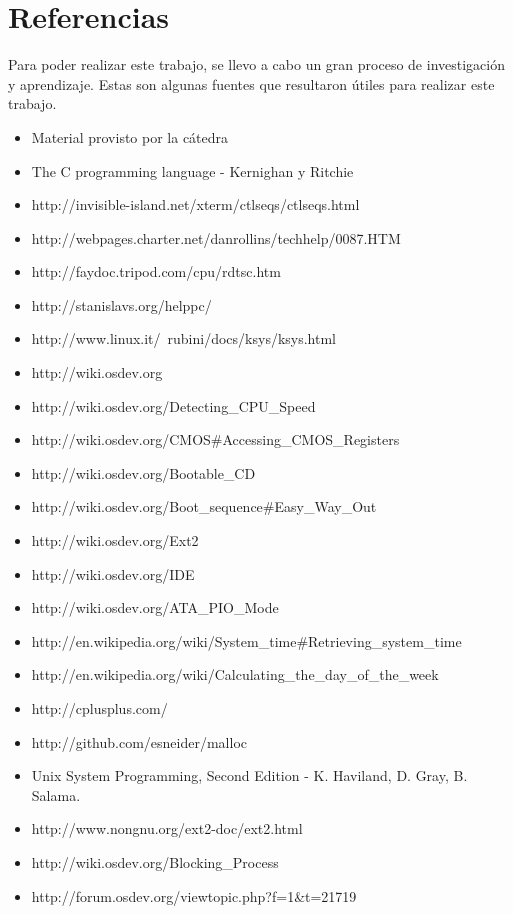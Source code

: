 \documentclass[a4paper,10pt]{article}
\begin{document}
\newpage     
\section{Referencias}

Para poder realizar este trabajo, se llevo a cabo un gran proceso de investigación y aprendizaje. Estas son algunas fuentes que resultaron útiles para realizar 
este trabajo.\\

\begin{itemize}
  \item Material provisto por la cátedra
  \item The C programming language - Kernighan y Ritchie
  \item http://invisible-island.net/xterm/ctlseqs/ctlseqs.html
  \item http://webpages.charter.net/danrollins/techhelp/0087.HTM
  \item http://faydoc.tripod.com/cpu/rdtsc.htm
  \item http://stanislavs.org/helppc/
  \item http://www.linux.it/~rubini/docs/ksys/ksys.html
  \item http://wiki.osdev.org
  \item http://wiki.osdev.org/Detecting\_CPU\_Speed
  \item	http://wiki.osdev.org/CMOS\#Accessing\_CMOS\_Registers
  \item http://wiki.osdev.org/Bootable\_CD
  \item http://wiki.osdev.org/Boot\_sequence\#Easy\_Way\_Out
  \item http://wiki.osdev.org/Ext2
  \item http://wiki.osdev.org/IDE
  \item http://wiki.osdev.org/ATA\_PIO\_Mode
  \item http://en.wikipedia.org/wiki/System\_time\#Retrieving\_system\_time
  \item http://en.wikipedia.org/wiki/Calculating\_the\_day\_of\_the\_week
  \item http://cplusplus.com/
  \item http://github.com/esneider/malloc
  \item Unix System Programming, Second Edition - K. Haviland, D. Gray, B. Salama.
  \item http://www.nongnu.org/ext2-doc/ext2.html
  \item http://wiki.osdev.org/Blocking\_Process
  \item http://forum.osdev.org/viewtopic.php?f=1\&t=21719

\end{itemize}
\end{document}
